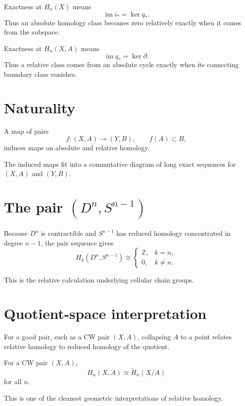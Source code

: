 Exactness at \(H_n(X)\) means
\[
\operatorname{im}i_*=\ker q_*.
\]
Thus an absolute homology class becomes zero relatively exactly when it comes
from the subspace.

Exactness at \(H_n(X,A)\) means
\[
\operatorname{im}q_*=\ker\partial.
\]
Thus a relative class comes from an absolute cycle exactly when its connecting
boundary class vanishes.

\section{Naturality}

A map of pairs
\[
f:(X,A)\to(Y,B),
\qquad
f(A)\subset B,
\]
induces maps on absolute and relative homology.

\begin{theorem}
\label{thm:viii19-naturality}
The induced maps fit into a commutative diagram of long exact sequences for
\((X,A)\) and \((Y,B)\).
\end{theorem}

\section{The pair \((D^n,S^{n-1})\)}

Because \(D^n\) is contractible and \(S^{n-1}\) has reduced homology concentrated
in degree \(n-1\), the pair sequence gives
\[
H_k(D^n,S^{n-1})
\cong
\begin{cases}
\mathbb Z,&k=n,\\
0,&k\ne n.
\end{cases}
\]

This is the relative calculation underlying cellular chain groups.

\section{Quotient-space interpretation}

For a good pair, such as a CW pair \((X,A)\), collapsing \(A\) to a point
relates relative homology to reduced homology of the quotient.

\begin{theorem}
\label{thm:viii19-quotient}
For a CW pair \((X,A)\),
\[
H_n(X,A)
\cong
\widetilde H_n(X/A)
\]
for all \(n\).
\end{theorem}

This is one of the cleanest geometric interpretations of relative homology.

